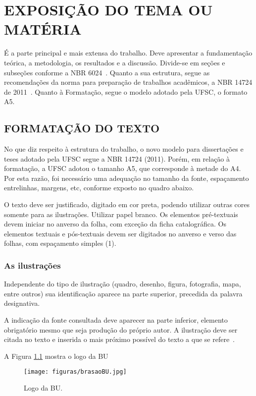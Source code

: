 \chapter{EXPOSIÇÃO DO TEMA OU MATÉRIA}

É a parte principal e mais extensa do trabalho.
Deve apresentar a fundamentação teórica,
a metodologia,
os resultados
e a discussão.
Divide-se em seções e subseções
conforme a NBR 6024~\cite{abnt14724}.
Quanto a sua estrutura,
segue as recomendações da norma
para preparação de trabalhos acadêmicos,
a NBR 14724 de 2011~\cite{abnt14724}.
Quanto à Formatação,
segue o modelo adotado pela UFSC, o formato A5.

\section{FORMATAÇÃO DO TEXTO}

No que diz respeito à estrutura do trabalho,
o novo modelo para dissertações e teses
adotado pela UFSC
segue a NBR 14724 (2011).
Porém, em relação à formatação,
a UFSC adotou o tamanho A5,
que corresponde à metade do A4.
Por esta razão,
foi necessário uma adequação no tamanho da fonte,
espaçamento entrelinhas,
margens,
etc,
conforme exposto no quadro abaixo.

O texto deve ser justificado,
digitado em cor preta,
podendo utilizar outras cores
somente para as ilustrações.
Utilizar papel branco.
Os elementos pré-textuais
devem iniciar no anverso da folha,
com exceção da ficha catalográfica.
Os elementos textuais e pós-textuais
devem ser digitados no anverso e verso das folhas,
com espaçamento simples (1).

\subsection{As ilustrações}

Independente do tipo de ilustração 
(quadro, desenho, figura, fotografia, mapa, entre outros)
sua identificação aparece na parte superior,
precedida da palavra designativa.

A indicação da fonte consultada
deve aparecer na parte inferior,
elemento obrigatório mesmo que seja produção do próprio autor.
A ilustração deve ser citada no texto
e inserida o mais próximo possível do texto
a que se refere~\cite{abnt14724}.

A Figura \ref{fig:a} mostra o logo da BU
\begin{figure}[!htb]
   \centering
   \caption{Logo da BU.}\label{fig:a}
   \texttt{[image: figuras/brasaoBU.jpg]}
\end{figure}

